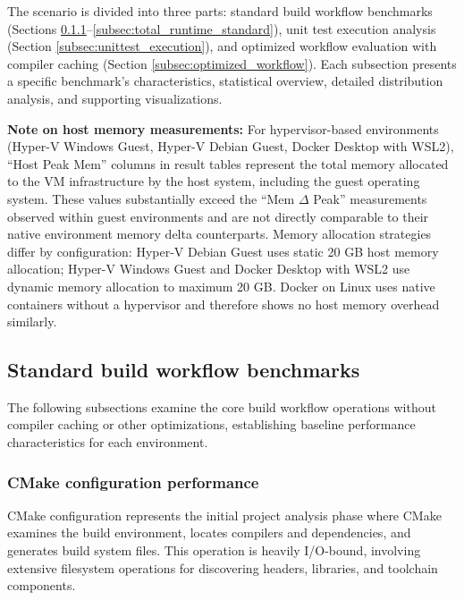 The scenario is divided into three parts: standard build workflow benchmarks (Sections \ref{subsec:cmake_configure}--\ref{subsec:total_runtime_standard}), unit test execution analysis (Section \ref{subsec:unittest_execution}), and optimized workflow evaluation with compiler caching (Section \ref{subsec:optimized_workflow}).
Each subsection presents a specific benchmark's characteristics, statistical overview, detailed distribution analysis, and supporting visualizations.

\textbf{Note on host memory measurements:} For hypervisor-based environments (Hyper-V Windows Guest, Hyper-V Debian Guest, Docker Desktop with WSL2), ``Host Peak Mem'' columns in result tables represent the total memory allocated to the VM infrastructure by the host system, including the guest operating system.
These values substantially exceed the ``Mem $\Delta$ Peak'' measurements observed within guest environments and are not directly comparable to their native environment memory delta counterparts.
Memory allocation strategies differ by configuration: Hyper-V Debian Guest uses static 20 GB host memory allocation; Hyper-V Windows Guest and Docker Desktop with WSL2 use dynamic memory allocation to maximum 20 GB.
Docker on Linux uses native containers without a hypervisor and therefore shows no host memory overhead similarly.

\subsection{Standard build workflow benchmarks}
\label{subsec:standard_build_workflow}

The following subsections examine the core build workflow operations without compiler caching or other optimizations, establishing baseline performance characteristics for each environment.

\subsubsection{CMake configuration performance}
\label{subsec:cmake_configure}

CMake configuration represents the initial project analysis phase where CMake examines the build environment, locates compilers and dependencies, and generates build system files.
This operation is heavily I/O-bound, involving extensive filesystem operations for discovering headers, libraries, and toolchain components.

